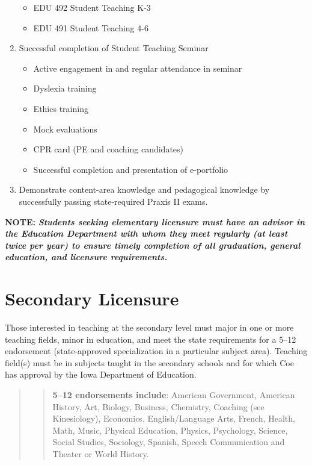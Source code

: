 \documentclass[
  letterpaper,
]{scrbook}
\providecommand{\tightlist}{%
  \setlength{\itemsep}{0pt}\setlength{\parskip}{0pt}}
\begin{document}
\begin{enumerate}
  \begin{itemize}
  \tightlist
  \item
    EDU 492 Student Teaching K-3
  \item
    EDU 491 Student Teaching 4-6
  \end{itemize}
\item
  Successful completion of Student Teaching Seminar

  \begin{itemize}
  \tightlist
  \item
    Active engagement in and regular attendance in seminar
  \item
    Dyslexia training
  \item
    Ethics training
  \item
    Mock evaluations
  \item
    CPR card (PE and coaching candidates)
  \item
    Successful completion and presentation of e-portfolio
  \end{itemize}
\item
  Demonstrate content-area knowledge and pedagogical knowledge by
  successfully passing state-required Praxis II exams.
\end{enumerate}

\textbf{NOTE:} \textbf{\emph{Students seeking elementary licensure must
have an advisor in the Education Department with whom they meet
regularly (at least twice per year) to ensure timely completion of all
graduation, general education, and licensure requirements.}}

\section{Secondary Licensure}\label{secondary-licensure}

Those interested in teaching at the secondary level must major in one or
more teaching fields, minor in education, and meet the state
requirements for a 5--12 endorsement (state-approved specialization in a
particular subject area). Teaching field(s) must be in subjects taught
in the secondary schools and for which Coe has approval by the Iowa
Department of Education.

\begin{quote}
\begin{quote}
\textbf{5--12 endorsements include}: American Government, American
History, Art, Biology, Business, Chemistry, Coaching (see Kinesiology),
Economics, English/Language Arts, French, Health, Math, Music, Physical
Education, Physics, Psychology, Science, Social Studies, Sociology,
Spanish, Speech Communication and Theater or World History.
\end{quote}
\end{quote}
\end{document}
